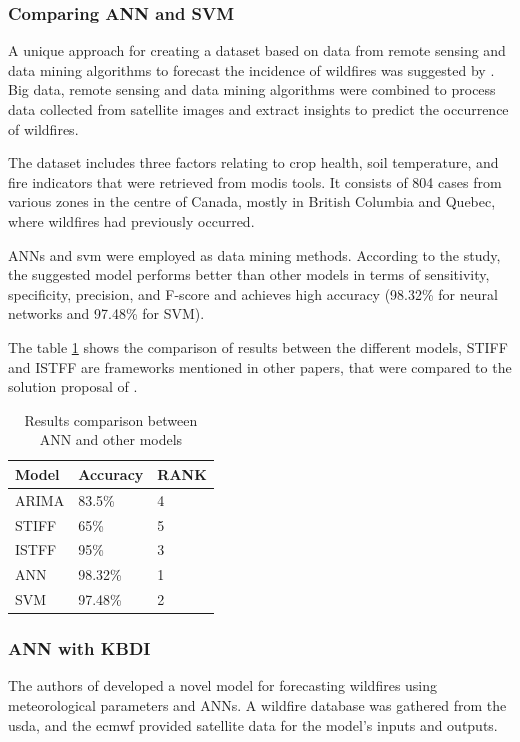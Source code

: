 \subsubsection{Comparing ANN and SVM}
\label{ComparingANN_SVM}
A unique approach for creating a dataset based on data from remote sensing and data mining algorithms to forecast the incidence of wildfires was suggested by \cite{SAYAD2019130}. Big data, remote sensing and data mining algorithms were combined to process data collected from satellite images and extract insights to predict the occurrence of wildfires.


The dataset includes three factors relating to crop health, soil temperature, and fire indicators that were retrieved from \gls{modis} tools. It consists of 804 cases from various zones in the centre of Canada, mostly in British Columbia and Quebec, where wildfires had previously occurred.


ANNs and \gls{svm} were employed as data mining methods. According to the study, the suggested model performs better than other models in terms of sensitivity, specificity, precision, and F-score and achieves high accuracy (98.32\% for neural networks and 97.48\% for SVM). 


The table \ref{arima} shows the comparison of results between the different models, STIFF and ISTFF are frameworks mentioned in other papers, that were compared to the solution proposal of \cite{SAYAD2019130}.


\begin{table}[h!]
\caption{Results comparison between ANN and other models}
\centering
\begin{tabular}{|l|l|l|}
\hline
\textbf{Model} & \textbf{Accuracy} & \textbf{RANK} \\ \hline
ARIMA & 83.5\% & 4 \\ \hline
STIFF & 65\% & 5 \\ \hline
ISTFF & 95\% & 3 \\ \hline
ANN & 98.32\% & 1 \\ \hline
SVM & 97.48\% & 2 \\ \hline
\end{tabular}
\label{arima}
\end{table}


\subsubsection{ANN with KBDI}
The authors of \cite{sadatrazavi2022predicting} developed a novel model for forecasting wildfires using meteorological parameters and ANNs. A wildfire database was gathered from the \gls{usda}, and the \gls{ecmwf} provided satellite data for the model's inputs and outputs. 


